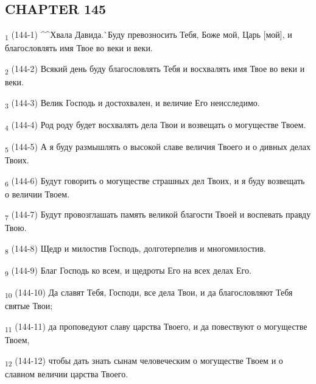 \subsection{CHAPTER 145}
\begin{tcolorbox}
\textsubscript{1} (144-1) ^^Хвала Давида.^^ Буду превозносить Тебя, Боже мой, Царь [мой], и благословлять имя Твое во веки и веки.
\end{tcolorbox}
\begin{tcolorbox}
\textsubscript{2} (144-2) Всякий день буду благословлять Тебя и восхвалять имя Твое во веки и веки.
\end{tcolorbox}
\begin{tcolorbox}
\textsubscript{3} (144-3) Велик Господь и достохвален, и величие Его неисследимо.
\end{tcolorbox}
\begin{tcolorbox}
\textsubscript{4} (144-4) Род роду будет восхвалять дела Твои и возвещать о могуществе Твоем.
\end{tcolorbox}
\begin{tcolorbox}
\textsubscript{5} (144-5) А я буду размышлять о высокой славе величия Твоего и о дивных делах Твоих.
\end{tcolorbox}
\begin{tcolorbox}
\textsubscript{6} (144-6) Будут говорить о могуществе страшных дел Твоих, и я буду возвещать о величии Твоем.
\end{tcolorbox}
\begin{tcolorbox}
\textsubscript{7} (144-7) Будут провозглашать память великой благости Твоей и воспевать правду Твою.
\end{tcolorbox}
\begin{tcolorbox}
\textsubscript{8} (144-8) Щедр и милостив Господь, долготерпелив и многомилостив.
\end{tcolorbox}
\begin{tcolorbox}
\textsubscript{9} (144-9) Благ Господь ко всем, и щедроты Его на всех делах Его.
\end{tcolorbox}
\begin{tcolorbox}
\textsubscript{10} (144-10) Да славят Тебя, Господи, все дела Твои, и да благословляют Тебя святые Твои;
\end{tcolorbox}
\begin{tcolorbox}
\textsubscript{11} (144-11) да проповедуют славу царства Твоего, и да повествуют о могуществе Твоем,
\end{tcolorbox}
\begin{tcolorbox}
\textsubscript{12} (144-12) чтобы дать знать сынам человеческим о могуществе Твоем и о славном величии царства Твоего.
\end{tcolorbox}

